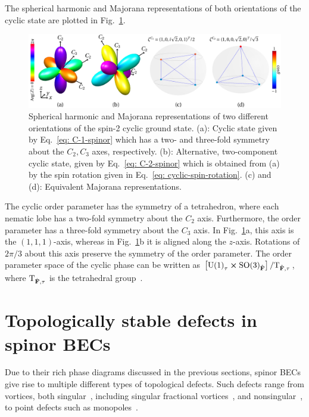 The spherical harmonic and Majorana representations of both orientations of the
cyclic state are plotted in Fig.~\ref{fig: cyclic-graph}.
\begin{figure}
    \centering
    \includegraphics[width=\textwidth]
    {gfx/ch-groundStateSymmetries/spin-2-cyclic.pdf}
    \caption[Graphical representations of two different orientations of the
    cyclic ground state.]
    {\label{fig: cyclic-graph}Spherical harmonic and Majorana representations of
    two different orientations of the spin-2 cyclic ground state.
    (a): Cyclic state given by Eq.~\eqref{eq: C-1-spinor} which has a two- and
    three-fold symmetry about the \(C_2, C_3\) axes, respectively.
    (b): Alternative, two-component cyclic state, given by
    Eq.~\eqref{eq: C-2-spinor} which is obtained from (a) by the spin rotation
    given in Eq.~\eqref{eq: cyclic-spin-rotation}.
    (c) and (d): Equivalent Majorana representations.}
\end{figure}
The cyclic order parameter has the symmetry of a tetrahedron, where each nematic
lobe has a two-fold symmetry about the \(C_2\) axis.
Furthermore, the order parameter has a three-fold symmetry about the \(C_3\)
axis.
In Fig.~\ref{fig: cyclic-graph}a, this axis is the \((1, 1, 1)\)-axis, whereas
in Fig.~\ref{fig: cyclic-graph}b it is aligned along the \(z\)-axis.
Rotations of \(2\pi/3\) about this axis preserve the symmetry of the order
parameter.
The order parameter space of the cyclic phase can be written as
\(\left[{\text{U}(1)}_\tau \cross {\text{SO}(3)}_{\hat{\vb{F}}}\right]
/ \text{T}_{\hat{\vb{F}}, \tau}\), where \(\text{T}_{\hat{\vb{F}}, \tau}\) is
the tetrahedral group~\cite{Kobayashi2012}.

\section{Topologically stable defects in spinor BECs}
Due to their rich phase diagrams discussed in the previous sections, spinor BECs
give rise to multiple different types of topological defects.
Such defects range from vortices, both singular~\cite{Yip1999,Isoshima2002,
Mizushima2002, Sadler2006,Semenoff2007,Lovegrove2012,Lovegrove2016,
Borgh2016,Weiss2019,Xiao2021,Xiao2022}, including singular
fractional vortices~\cite{Leonhardt2000, Zhou2003,Ji2008,Seo2015,Semenoff2007,
Kobayashi2009,Lovegrove2012, Lovegrove2016,Borgh2016,Borgh2017,Xiao2021,
Xiao2022}, and nonsingular~\cite{Ohmi1998, Ho1998, Mizushima2002a,
Martikainen2002, Leanhardt2003, Mizushima2004, Choi2012, Choi2012a,
Lovegrove2014,Weiss2019}, to point defects such as monopoles~\cite{Stoof2001,
Savage2003,Ruostekoski2003, Pietila2009,Ray2014,Ray2015,Ollikainen2017,
Mithun2022}.

